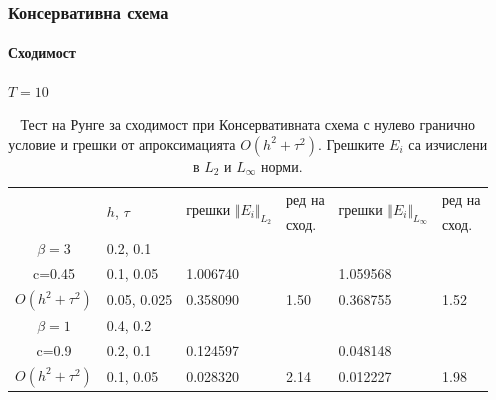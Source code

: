 \documentclass{beamer}
\begin{document}
\begin{frame}
\frametitle{Консервативна схема}
\framesubtitle{Сходимост}
$T = 10$
\begin{table}[ht]
\centering
\small
		\begin{tabular}{||c|l|ll|ll||}
			\hline
			\hline
      \multirow{2  }{*}{ }        & \multirow{2  }{*}{$h$, $\tau$}  & \multirow{2  }{*}{грешки $\Vert E_i\Vert_{L_2}$}  &ред на& \multirow{2  }{*}{грешки $\Vert E_i\Vert_{L_\infty}$}  &ред на  \\
	                                        &                                                     &                                                                 &  сход. &                                                                       & сход. \\
   			\hline 
					\hline 
  $\beta=3$                &0.2, 0.1         &                    &                &                  &                   \\
   c=0.45                     &0.1, 0.05         & 1.006740   &                & 1.059568 &                   \\
     $O(h^2 + \tau^ 2)$ &0.05, 0.025  &0.358090    	& 1.50       	& 0.368755   &   1.52   \\
	   \hline
			\hline 
       $\beta=1$           & 0.4, 0.2       &                   &           &                 &   \\
                  c=0.9       & 0.2, 0.1        & 0.124597   &          &0.048148  &   \\
  $O(h^2+ \tau^2)$  & 0.1, 0.05       & 0.028320   & 2.14  &0.012227  & 1.98 \\
	   \hline
			\hline 
		\end{tabular}
		\caption{Тест на Рунге за сходимост при Консервативната схема с нулево гранично условие и грешки от апроксимацията $O(h^{2} + \tau^2 )$. Грешките $E_i$ са изчислени в $L_2$ и $L_\infty$ норми.}
\label{tableC}
\end{table}

\end{frame}

\end{document}
